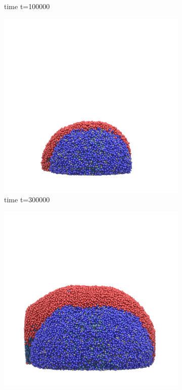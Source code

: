 \documentclass[12pt,titlepage]{report}
\theoremstyle{definition}
\theoremstyle{remark}
\begin{document}
\begin{figure}[!ht]
\begin{subfigure}[b]{.5\textwidth}
\caption{time t=100000}
\label{}
\end{subfigure}\vspace*{-.1em}
\begin{subfigure}[b]{.5\textwidth}
\includegraphics[height=.4\textheight]{image1000150}
\caption{time t=300000}
\label{}
\end{subfigure}\vspace*{-.1em}
\begin{subfigure}[b]{.5\textwidth}
\includegraphics[height=.4\textheight]{image1000175}

\end{subfigure}
\end{figure}
\end{document}

